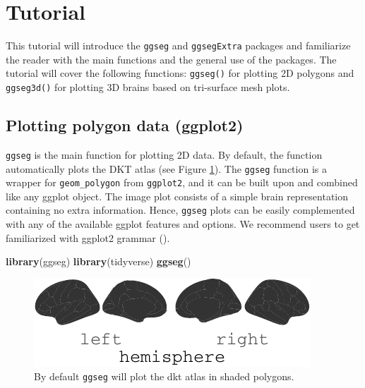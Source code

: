 \documentclass[fleqn,10pt]{wlpeerj} %
\newenvironment{Shaded}{\begin{snugshade}}{\end{snugshade}}
\newcommand{\KeywordTok}[1]{\textcolor[rgb]{0.13,0.29,0.53}{\textbf{#1}}}
\newcommand{\NormalTok}[1]{#1}
\begin{document}
\hypertarget{tutorial}{%
\section{Tutorial}\label{tutorial}}

This tutorial will introduce the \texttt{ggseg} and \texttt{ggsegExtra} packages and familiarize the reader with the main functions and the general use of the packages.
The tutorial will cover the following functions: \texttt{ggseg()} for plotting 2D polygons and \texttt{ggseg3d()} for plotting 3D brains based on tri-surface mesh plots.

\hypertarget{plotting-polygon-data-ggplot2}{%
\subsection{Plotting polygon data (ggplot2)}\label{plotting-polygon-data-ggplot2}}

\texttt{ggseg} is the main function for plotting 2D data.
By default, the function automatically plots the DKT atlas (see Figure \ref{fig:init}).
The \texttt{ggseg} function is a wrapper for \texttt{geom\_polygon} from \texttt{ggplot2}, and it can be built upon and combined like any ggplot object.
The image plot consists of a simple brain representation containing no extra information.
Hence, \texttt{ggseg} plots can be easily complemented with any of the available ggplot features and options.
We recommend users to get familiarized with ggplot2 grammar (\citet{ggplot}).

\begin{Shaded}
\begin{Highlighting}[]
\KeywordTok{library}\NormalTok{(ggseg)}
\KeywordTok{library}\NormalTok{(tidyverse)}
\KeywordTok{ggseg}\NormalTok{()}
\end{Highlighting}
\end{Shaded}

\begin{figure}
\centering
\includegraphics{draft_2_files/figure-latex/init-1.pdf}
\caption{\label{fig:init}By default \texttt{ggseg} will plot the dkt atlas in shaded polygons.}
\end{figure}
\end{document}
